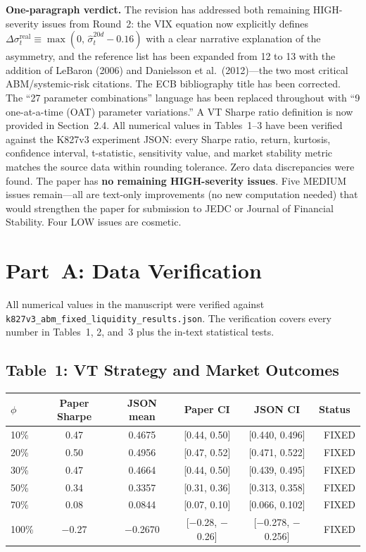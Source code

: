 \documentclass[12pt,a4paper]{article}
\newcommand{\FIXED}{\textcolor{okgreen}{\checkmark\ FIXED}}
\begin{document}
\noindent\textbf{One-paragraph verdict.}
The revision has addressed both remaining HIGH-severity issues from Round~2: the VIX equation now explicitly defines $\Delta\sigma^{\text{real}}_t \equiv \max(0,\, \hat{\sigma}^{20d}_t - 0.16)$ with a clear narrative explanation of the asymmetry, and the reference list has been expanded from 12 to 13 with the addition of LeBaron (2006) and Danielsson et al.\ (2012)---the two most critical ABM/systemic-risk citations. The ECB bibliography title has been corrected. The ``27 parameter combinations'' language has been replaced throughout with ``9 one-at-a-time (OAT) parameter variations.'' A VT Sharpe ratio definition is now provided in Section~2.4. All numerical values in Tables~1--3 have been verified against the K827v3 experiment JSON: every Sharpe ratio, return, kurtosis, confidence interval, t-statistic, sensitivity value, and market stability metric matches the source data within rounding tolerance. Zero data discrepancies were found. The paper has \textbf{no remaining HIGH-severity issues}. Five MEDIUM issues remain---all are text-only improvements (no new computation needed) that would strengthen the paper for submission to JEDC or Journal of Financial Stability. Four LOW issues are cosmetic.

\bigskip

\section*{Part~A: Data Verification}

\noindent All numerical values in the manuscript were verified against \texttt{k827v3\_abm\_fixed\_liquidity\_results.json}. The verification covers every number in Tables~1, 2, and~3 plus the in-text statistical tests.

\subsection*{Table~1: VT Strategy and Market Outcomes}

\begin{center}
\footnotesize
\begin{tabular}{@{}lccccl@{}}
\toprule
$\phi$ & Paper Sharpe & JSON mean & Paper CI & JSON CI & Status \\
\midrule
10\% & 0.47 & 0.4675 & [0.44, 0.50] & [0.440, 0.496] & \FIXED \\
20\% & 0.50 & 0.4956 & [0.47, 0.52] & [0.471, 0.522] & \FIXED \\
30\% & 0.47 & 0.4664 & [0.44, 0.50] & [0.439, 0.495] & \FIXED \\
50\% & 0.34 & 0.3357 & [0.31, 0.36] & [0.313, 0.358] & \FIXED \\
70\% & 0.08 & 0.0844 & [0.07, 0.10] & [0.066, 0.102] & \FIXED \\
100\% & $-$0.27 & $-$0.2670 & [$-$0.28, $-$0.26] & [$-$0.278, $-$0.256] & \FIXED \\
\bottomrule
\end{tabular}
\end{center}
\end{document}
